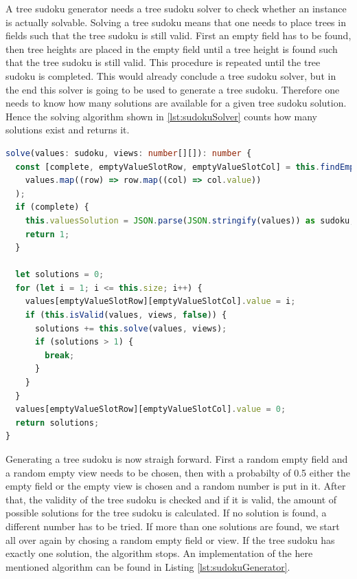 A tree sudoku generator needs a tree sudoku solver to check whether an instance is actually solvable. Solving a tree sudoku means that one needs to place trees in fields such that the tree sudoku is still valid. First an empty field has to be found, then tree heights are placed in the empty field until a tree height is found such that the tree sudoku is still valid. This procedure is repeated until the tree sudoku is completed. This would already conclude a tree sudoku solver, but in the end this solver is going to be used to generate a tree sudoku. Therefore one needs to know how many solutions are available for a given tree sudoku solution. Hence the solving algorithm shown in \ref{lst:sudokuSolver} counts how many solutions exist and returns it.

\begin{lstlisting}[language=TypeScript,caption={Solving algorithm for a tree sudoku instance},label={lst:sudokuSolver}]
solve(values: sudoku, views: number[][]): number {
  const [complete, emptyValueSlotRow, emptyValueSlotCol] = this.findEmptySlot(
    values.map((row) => row.map((col) => col.value))
  );
  if (complete) {
    this.valuesSolution = JSON.parse(JSON.stringify(values)) as sudoku; // deep copy
    return 1;
  }

  let solutions = 0;
  for (let i = 1; i <= this.size; i++) {
    values[emptyValueSlotRow][emptyValueSlotCol].value = i;
    if (this.isValid(values, views, false)) {
      solutions += this.solve(values, views);
      if (solutions > 1) {
        break;
      }
    }
  }
  values[emptyValueSlotRow][emptyValueSlotCol].value = 0;
  return solutions;
}
\end{lstlisting}

Generating a tree sudoku is now straigh forward. First a random empty field and a random empty view needs to be chosen, then with a probabilty of 0.5 either the empty field or the empty view is chosen and a random number is put in it. After that, the validity of the tree sudoku is checked and if it is valid, the amount of possible solutions for the tree sudoku is calculated. If no solution is found, a different number has to be tried. If more than one solutions are found, we start all over again by chosing a random empty field or view. If the tree sudoku has exactly one solution, the algorithm stops. An implementation of the here mentioned algorithm can be found in Listing \ref{lst:sudokuGenerator}.

